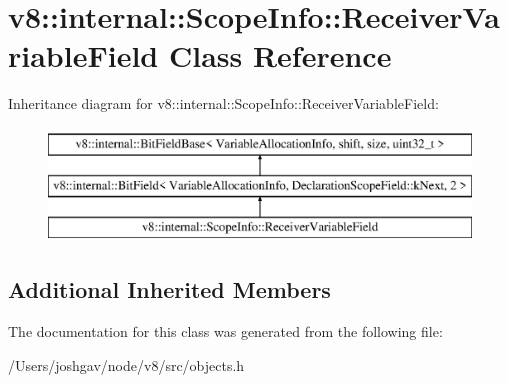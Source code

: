 \hypertarget{classv8_1_1internal_1_1_scope_info_1_1_receiver_variable_field}{}\section{v8\+:\+:internal\+:\+:Scope\+Info\+:\+:Receiver\+Variable\+Field Class Reference}
\label{classv8_1_1internal_1_1_scope_info_1_1_receiver_variable_field}
Inheritance diagram for v8\+:\+:internal\+:\+:Scope\+Info\+:\+:Receiver\+Variable\+Field\+:\begin{figure}[H]
\begin{center}
\leavevmode
\includegraphics[height=3.000000cm]{classv8_1_1internal_1_1_scope_info_1_1_receiver_variable_field}
\end{center}
\end{figure}
\subsection*{Additional Inherited Members}


The documentation for this class was generated from the following file\+:\begin{DoxyCompactItemize}
\item 
/\+Users/joshgav/node/v8/src/objects.\+h\end{DoxyCompactItemize}
